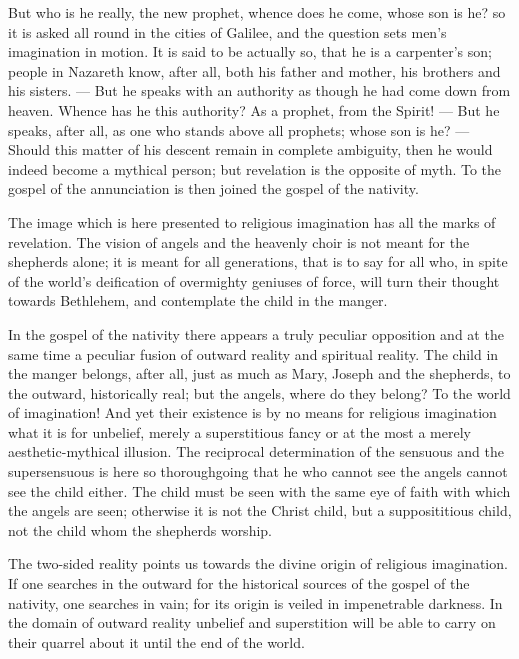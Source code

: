 \documentclass[12pt,a4paper,openany]{book}
\newcommand{\opage}[1]{\marginnote{\footnotesize\textit{[#1]}}}
\begin{document}
But who is he really, the new prophet, whence
\setcounter{footnote}{0}%
\opage{60}does he come, whose son is he? so it is asked all
round in the cities of Galilee, and the question sets
men's imagination in motion. It is said to be
actually so, that he is a carpenter's son; people in
Nazareth know, after all, both his father and mother, his
brothers and his sisters. --- But he speaks with an
authority as though he had come down from heaven. Whence
has he this authority? As a prophet, from
the Spirit! --- But he speaks, after all, as one who stands above
all prophets; whose son is he? --- Should this matter of
his descent remain in complete ambiguity, then he would
indeed become a mythical person; but revelation is the
opposite of myth. To the gospel of the annunciation is
then joined the gospel of the nativity.

The image which is here presented to religious
imagination has all the marks of revelation. The vision of angels
and the heavenly choir is not meant for
the shepherds alone; it is meant for all generations, that is to
say for all who, in spite of the world's deification of overmighty
geniuses of force, will turn their thought towards
Bethlehem, and contemplate the child in the manger.

In the gospel of the nativity there appears a truly peculiar
opposition and at the same time a peculiar fusion
of outward reality and spiritual reality. The child in
the manger belongs, after all, just as much as Mary, Joseph and
the shepherds, to the outward, historically real; but
the angels, where do they belong? To the world of imagination!
And yet their existence is by no means for religious
imagination what it is for unbelief, merely a superstitious
fancy or at the most a merely aesthetic-mythical
illusion. The reciprocal determination of the sensuous and
the supersensuous is here so thoroughgoing that he who
\setcounter{footnote}{0}%
\opage{61}cannot see the angels cannot see the child either.
The child must be seen with the same eye of faith with which
the angels are seen; otherwise it is not the Christ child, %
but a supposititious child, not the child whom the shepherds
worship.

The two-sided reality points us towards the divine
origin of religious imagination. If
one searches in the outward for the historical sources of the gospel of the nativity,
one searches in vain; for its origin
is veiled in impenetrable darkness. In the domain of
outward reality unbelief and superstition
will be able to carry on their quarrel about it until the end of the world.
\end{document}
